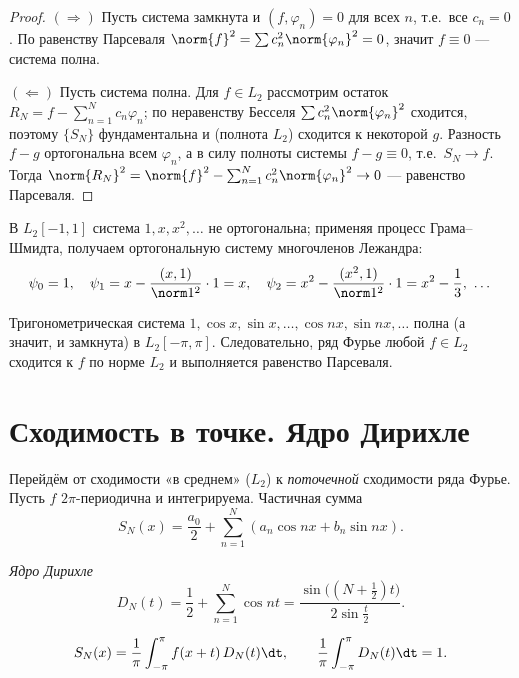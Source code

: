 \begin{proof}
$(\Rightarrow)$ Пусть система замкнута и $(f,\varphi_n)=0$ для всех $n$, т.е.\ все $c_n=0$. По
равенству Парсеваля $\norm{f}^2=\sum c_n^2\norm{\varphi_n}^2=0$, значит $f\equiv0$ — система полна.

$(\Leftarrow)$ Пусть система полна. Для $f\in L_2$ рассмотрим остаток
$R_N=f-\sum_{n=1}^N c_n\varphi_n$; по неравенству Бесселя $\sum c_n^2\norm{\varphi_n}^2$ сходится,
поэтому $\{S_N\}$ фундаментальна и (полнота $L_2$) сходится к некоторой $g$. Разность $f-g$
ортогональна всем $\varphi_n$, а в силу полноты системы $f-g\equiv0$, т.е.\ $S_N\to f$. Тогда
$\norm{R_N}^2=\norm{f}^2-\sum_{n=1}^N c_n^2\norm{\varphi_n}^2\to0$ — равенство Парсеваля.
\end{proof}

\begin{example}
В $L_2[-1,1]$ система $1,x,x^2,\dots$ не ортогональна; применяя процесс Грама--Шмидта, получаем
ортогональную систему многочленов Лежандра:
\[
  \psi_0=1,\quad \psi_1=x-\frac{(x,1)}{\norm1^2}\cdot1=x,\quad
  \psi_2=x^2-\frac{(x^2,1)}{\norm1^2}\cdot1=x^2-\frac13,\ \dots
\]
\end{example}

\begin{theorem}
Тригонометрическая система $1,\cos x,\sin x,\dots,\cos nx,\sin nx,\dots$ полна (а значит, и
замкнута) в $L_2[-\pi,\pi]$. Следовательно, ряд Фурье любой $f\in L_2$ сходится к $f$ по норме
$L_2$ и выполняется равенство Парсеваля.
\end{theorem}

\section{Сходимость в точке. Ядро Дирихле}

Перейдём от сходимости «в среднем» ($L_2$) к \emph{поточечной} сходимости ряда Фурье. Пусть $f$
$2\pi$-периодична и интегрируема. Частичная сумма
\[
  S_N(x)=\frac{a_0}{2}+\sum_{n=1}^N(a_n\cos nx+b_n\sin nx).
\]

\begin{definition}
\emph{Ядро Дирихле}
\[
  D_N(t)=\frac12+\sum_{n=1}^N\cos nt=\frac{\sin\bigl((N+\tfrac12)t\bigr)}{2\sin\tfrac t2}.
\]
\end{definition}

\begin{theorem}
\[
  S_N(x)=\frac1\pi\int_{-\pi}^{\pi}f(x+t)\,D_N(t)\dt,\qquad
  \frac1\pi\int_{-\pi}^{\pi}D_N(t)\dt=1 .
\]
\end{theorem}

